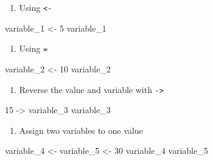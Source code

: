 \documentclass[
  letterpaper,
  DIV=11,
  numbers=noendperiod]{scrreprt}
\newenvironment{Shaded}{}{}
\newcommand{\DecValTok}[1]{\textcolor[rgb]{0.00,0.36,0.77}{#1}}
\newcommand{\NormalTok}[1]{\textcolor[rgb]{0.14,0.16,0.18}{#1}}
\newcommand{\OtherTok}[1]{\textcolor[rgb]{0.44,0.26,0.76}{#1}}
\providecommand{\tightlist}{%
  \setlength{\itemsep}{0pt}\setlength{\parskip}{0pt}}\usepackage{longtable,booktabs,array}
\begin{document}
\begin{enumerate}
\def\labelenumi{\arabic{enumi}.}
\tightlist
\item
  Using \texttt{\textless{}-}
\end{enumerate}

\begin{Shaded}
\begin{Highlighting}[]
\NormalTok{variable\_1 }\OtherTok{\textless{}{-}} \DecValTok{5}
\NormalTok{variable\_1}
\end{Highlighting}
\end{Shaded}

\begin{enumerate}
\def\labelenumi{\arabic{enumi}.}
\setcounter{enumi}{1}
\tightlist
\item
  Using \texttt{=}
\end{enumerate}

\begin{Shaded}
\begin{Highlighting}[]
\NormalTok{variable\_2 }\OtherTok{\textless{}{-}} \DecValTok{10}
\NormalTok{variable\_2}
\end{Highlighting}
\end{Shaded}

\begin{enumerate}
\def\labelenumi{\arabic{enumi}.}
\setcounter{enumi}{2}
\tightlist
\item
  Reverse the value and variable with \texttt{-\textgreater{}}
\end{enumerate}

\begin{Shaded}
\begin{Highlighting}[]
\DecValTok{15} \OtherTok{{-}\textgreater{}}\NormalTok{ variable\_3}
\NormalTok{variable\_3}
\end{Highlighting}
\end{Shaded}

\begin{enumerate}
\def\labelenumi{\arabic{enumi}.}
\setcounter{enumi}{3}
\tightlist
\item
  Assign two variables to one value
\end{enumerate}

\begin{Shaded}
\begin{Highlighting}[]
\NormalTok{variable\_4 }\OtherTok{\textless{}{-}}\NormalTok{ variable\_5 }\OtherTok{\textless{}{-}} \DecValTok{30}
\NormalTok{variable\_4}
\NormalTok{variable\_5}
\end{Highlighting}
\end{Shaded}
\end{document}
